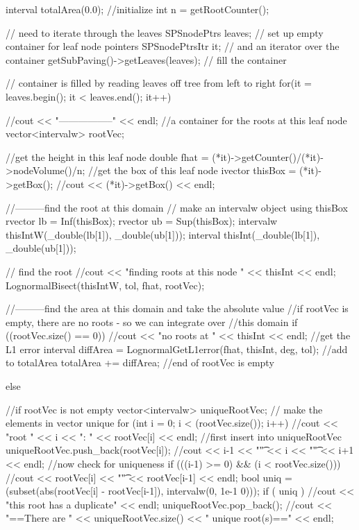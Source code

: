 \begin{DoxyCode}
{
  interval totalArea(0.0); //initialize
  int n = getRootCounter();

  // need to iterate through the leaves
  SPSnodePtrs leaves; // set up empty container for leaf node pointers
  SPSnodePtrsItr it; // and an iterator over the container
  getSubPaving()->getLeaves(leaves); // fill the container
  
  // container is filled by reading leaves off tree from left to right
  for(it = leaves.begin(); it < leaves.end(); it++) {
    //cout << "-----------------" << endl;
    //a container for the roots at this leaf node
    vector<intervalw> rootVec;
    
    //get the height in this leaf node
    double fhat = (*it)->getCounter()/(*it)->nodeVolume()/n;
    //get the box of this leaf node
    ivector thisBox = (*it)->getBox();
    //cout << (*it)->getBox() << endl;
    
    //---------find the root at this domain
    // make an intervalw object using thisBox
    rvector lb = Inf(thisBox);
    rvector ub = Sup(thisBox);
    intervalw thisIntW(_double(lb[1]), _double(ub[1]));
    interval thisInt(_double(lb[1]), _double(ub[1]));
    
    // find the root
    //cout << "finding roots at this node " << thisInt << endl;
    LognormalBisect(thisIntW, tol, fhat, rootVec); 

    //---------find the area at this domain and take the absolute value
    //if rootVec is empty, there are no roots - so we can integrate over
    //this domain
    if ((rootVec.size() == 0)) { 
      //cout << "no roots at " << thisInt << endl;
      //get the L1 error
      interval diffArea = LognormalGetL1error(fhat, thisInt, deg, tol);
      //add to totalArea
      totalArea += diffArea;
    } //end of rootVec is empty

    else { //if rootVec is not empty
      vector<intervalw> uniqueRootVec;
      // make the elements in vector unique
      for (int i = 0; i < (rootVec.size()); i++) {
        //cout << "root " << i << ": " << rootVec[i] << endl;
        //first insert into uniqueRootVec
        uniqueRootVec.push_back(rootVec[i]);
        //cout << i-1 << "\t" << i << "\t" << i+1 << endl;
        //now check for uniqueness
        if (((i-1) >= 0) && (i < rootVec.size())) {
          //cout << rootVec[i] << "\t" << rootVec[i-1] << endl;
          bool uniq = (subset(abs(rootVec[i] - rootVec[i-1]), intervalw(0, 1e-1
      0)));
          if ( uniq ) { 
            //cout << "this root has a duplicate" << endl;
            uniqueRootVec.pop_back(); }
        }
      }
      //cout << "==There are " << uniqueRootVec.size() << " unique root(s)=="
       << endl;

}}}
\end{DoxyCode}
